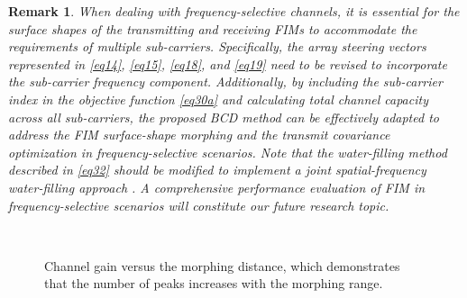\documentclass[lettersize,journal]{IEEEtran}
\newtheorem{remark}{\textbf{Remark}}
\begin{document}
\begin{remark}
When dealing with frequency-selective channels, it is essential for the surface shapes of the transmitting and receiving FIMs to accommodate the requirements of multiple sub-carriers. Specifically, the array steering vectors represented in \eqref{eq14}, \eqref{eq15}, \eqref{eq18}, and \eqref{eq19} need to be revised to incorporate the sub-carrier frequency component. Additionally, by including the sub-carrier index in the objective function \eqref{eq30a} and calculating total channel capacity across all sub-carriers, the proposed BCD method can be effectively adapted to address the FIM surface-shape morphing and the transmit covariance optimization in frequency-selective scenarios. Note that the water-filling method described in \eqref{eq32} should be modified to implement a joint spatial-frequency water-filling approach \cite{BOOK_2005_Tse_Fundamentals}. A comprehensive performance evaluation of FIM in frequency-selective scenarios will constitute our future research topic.
\end{remark}


\begin{figure}[!t]
\centering
{}
\\
\caption{Channel gain versus the morphing distance, which demonstrates that the number of peaks increases with the morphing range.}\vspace{-0.5cm}
\label{fig_3}
\end{figure}
\end{document}
